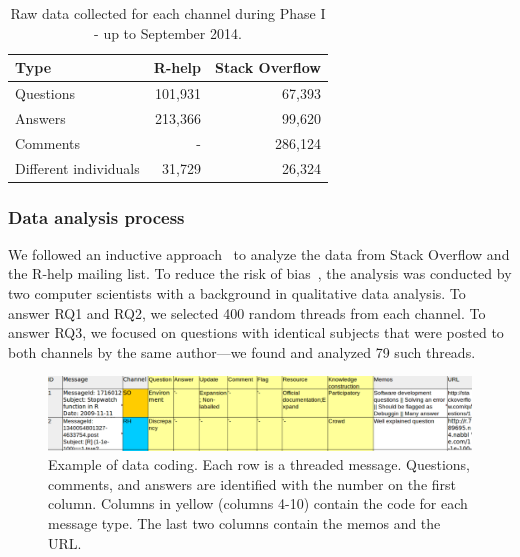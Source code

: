 \documentclass[smallextended]{svjour3}       %
\newcommand{\SO}{Stack Overflow\xspace}
\newcommand{\RH}{R-help\xspace}
\begin{document}
	\begin{table}[!htb]
	  \centering
      \caption{Raw data collected for each channel during Phase I - up to September 2014.}
      \begin{small}
        \begin{tabular}{lrr}
	        \toprule
	        Type          &  \RH & \SO \\
	        \midrule
	        Questions     & 101,931 &  67,393 \\
	        Answers       & 213,366 &  99,620 \\
	        Comments      &       - & 286,124 \\
          Different individuals & 31,729 &  26,324 \\
	        \bottomrule
        \end{tabular}
      \end{small}
	  \label{table:data}
	\end{table}

\subsubsection{Data analysis process}
\label{sec:dap}

We followed an inductive approach~\cite{Runeson2012} to analyze the data from \SO and the \RH mailing list. To reduce the risk of bias~\cite{Runeson2012}, the analysis was conducted by two computer scientists with a background in qualitative data analysis. To answer RQ1 and RQ2, we selected 400 random threads from each channel. To answer RQ3, we focused on questions with identical subjects that were posted to both channels by the same author---we found and analyzed 79 such threads.

\begin{figure}[htbp]
	\centering
	\includegraphics[width=.95\textwidth]{../Figures/CodingExample}
	\caption{Example of data coding. Each row is a threaded message. Questions, comments, and answers are identified with the number on the first column. Columns in yellow (columns 4-10) contain the code for each message type. The last two columns contain the memos and the URL.}
	\label{fig:CodingExample}
\end{figure}
\end{document}
